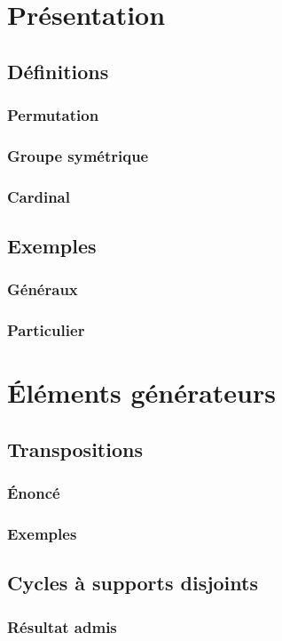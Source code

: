 \documentclass[12pt,a4paper,french]{book}
\begin{document}
	\section{Présentation}
		\subsection{Définitions}
			\subsubsection{Permutation}
			\subsubsection{Groupe symétrique}
			\subsubsection{Cardinal}
		\subsection{Exemples}
			\subsubsection{Généraux}
			\subsubsection{Particulier}
	\section{Éléments générateurs}
		\subsection{Transpositions}
			\subsubsection{Énoncé}
			\subsubsection{Exemples}
		\subsection{Cycles à supports disjoints}
			\subsubsection{Résultat admis}
\end{document}
